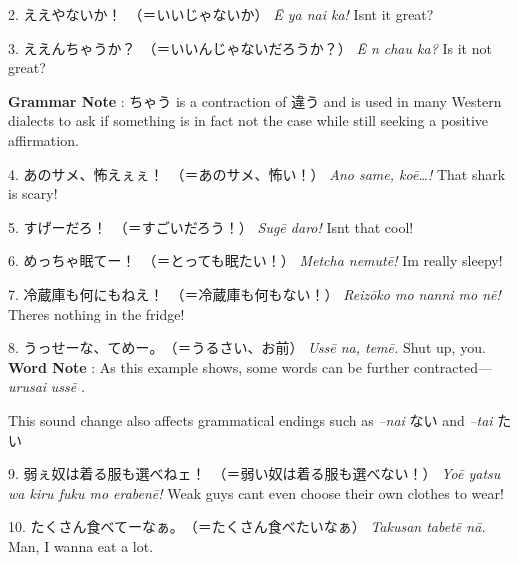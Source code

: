 \par{2. ええやないか！　（＝いいじゃないか） \hfill\break
 \emph{Ē ya nai ka! }\hfill\break
Isn\textquotesingle t it great? }
 
\par{3. ええんちゃうか？　（＝いいんじゃないだろうか？） \hfill\break
 \emph{Ē n chau ka? }\hfill\break
Is it not great? }
 
\par{\textbf{Grammar Note }: ちゃう is a contraction of 違う and is used in many Western dialects to ask if something is in fact not the case while still seeking a positive affirmation. }
 
\par{4. あのサメ、怖えぇぇ！　（＝あのサメ、怖い！） \hfill\break
 \emph{Ano same, koē…! }\emph{ }\hfill\break
That shark is scary! }
 
\par{5. すげーだろ！　（＝すごいだろう！） \hfill\break
 \emph{Sugē daro! }\hfill\break
Isn\textquotesingle t that cool! }
 
\par{6. めっちゃ眠てー！　（＝とっても眠たい！） \hfill\break
 \emph{Metcha nemutē! }\hfill\break
I\textquotesingle m really sleepy! }
 
\par{7. 冷蔵庫も何にもねえ！　（＝冷蔵庫も何もない！） \hfill\break
 \emph{Reizōko mo nan\textquotesingle ni mo nē! }\hfill\break
There\textquotesingle s nothing in the fridge! }
 
\par{8. うっせーな、てめー。　（＝うるさい、お前） \hfill\break
 \emph{Ussē na, temē. }\hfill\break
Shut up, you. \hfill\break
 \hfill\break
 \textbf{Word Note }: As this example shows, some words can be further contracted— \emph{urusai }\textrightarrow  \emph{ussē }. }
 
\par{This sound change also affects grammatical endings such as \emph{–nai }ない and \emph{–tai }たい }
 
\par{9. 弱ぇ奴は着る服も選べねェ！　（＝弱い奴は着る服も選べない！） \hfill\break
 \emph{Yoē yatsu wa kiru fuku mo erabenē! }\hfill\break
Weak guys can\textquotesingle t even choose their own clothes to wear! }
 
\par{10. たくさん食べてーなぁ。　（＝たくさん食べたいなぁ） \hfill\break
\emph{Takusan tabetē nā. } \hfill\break
Man, I wanna eat a lot. }
 
